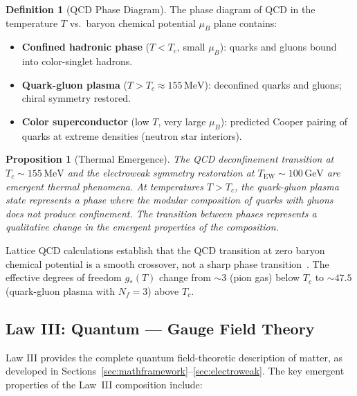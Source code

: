 \documentclass[12pt]{article}
\newtheorem{proposition}[theorem]{Proposition}
\theoremstyle{definition}
\newtheorem{definition}[theorem]{Definition}
\theoremstyle{remark}
\newcommand{\GeV}{\,\mathrm{GeV}}
\newcommand{\MeV}{\,\mathrm{MeV}}
\begin{document}
\begin{definition}[QCD Phase Diagram]
\label{def:qcdphase}
The phase diagram of QCD in the temperature $T$ vs.\ baryon chemical potential $\mu_B$ plane contains:
\begin{itemize}
    \item \textbf{Confined hadronic phase} ($T < T_c$, small $\mu_B$): quarks and gluons bound into color-singlet hadrons.
    \item \textbf{Quark-gluon plasma} ($T > T_c \approx 155\MeV$): deconfined quarks and gluons; chiral symmetry restored.
    \item \textbf{Color superconductor} (low $T$, very large $\mu_B$): predicted Cooper pairing of quarks at extreme densities (neutron star interiors).
\end{itemize}
\end{definition}

\begin{proposition}[Thermal Emergence]
\label{prop:thermal}
The QCD deconfinement transition at $T_c \sim 155\MeV$ and the electroweak symmetry restoration at $T_{\mathrm{EW}} \sim 100\GeV$ are emergent thermal phenomena. At temperatures $T > T_c$, the quark-gluon plasma state represents a phase where the modular composition of quarks with gluons does not produce confinement. The transition between phases represents a qualitative change in the emergent properties of the composition.
\end{proposition}

Lattice QCD calculations establish that the QCD transition at zero baryon chemical potential is a smooth crossover, not a sharp phase transition~\cite{HotQCD2019}. The effective degrees of freedom $g_*(T)$ change from $\sim 3$ (pion gas) below $T_c$ to $\sim 47.5$ (quark-gluon plasma with $N_f = 3$) above $T_c$.

\subsection{Law III: Quantum --- Gauge Field Theory}

Law III provides the complete quantum field-theoretic description of matter, as developed in Sections~\ref{sec:mathframework}--\ref{sec:electroweak}. The key emergent properties of the Law~III composition include:
\end{document}
